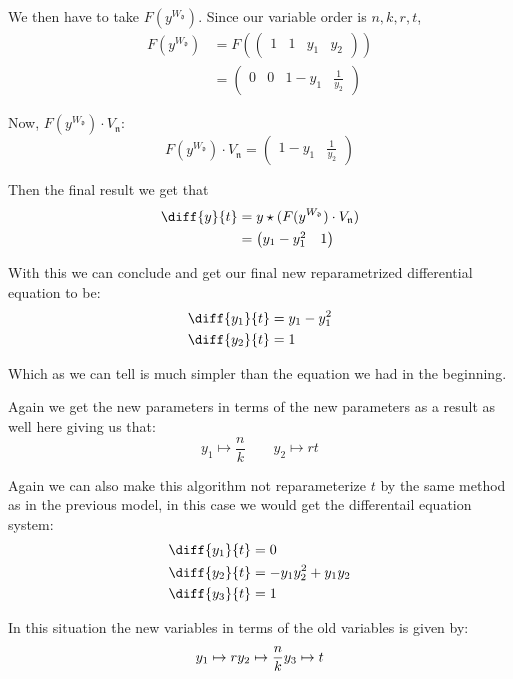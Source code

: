 \documentclass[oneside, a4paper, onecolumn, 11pt]{article}
\begin{document}
We then have to take \(F(y^{W_{\mathfrak{d}}})\). Since our variable order is \(n, k, r, t\),
\begin{align*}
    F(y^{W_{\mathfrak{d}}})
     & = F(\begin{pmatrix}
               1 & 1 & y_1 & y_2
           \end{pmatrix})             \\
     & = \begin{pmatrix}
             0 & 0 & 1 - y_1 & \frac{1}{y_2}
         \end{pmatrix}
\end{align*}

Now, \(F(y^{W_{\mathfrak{d}}}) \cdot V_{\mathfrak{n}}\):
\[
    F(y^{W_{\mathfrak{d}}}) \cdot V_{\mathfrak{n}} =
    \begin{pmatrix}
        1 - y_1 & \frac{1}{y_2}
    \end{pmatrix}
\]

Then the final result we get that
\begin{align*}
    \diff{y}{t}
     & = y \star (F(y^{W_{\mathfrak{d}}}) \cdot V_{\mathfrak{n}}) \\
     & = \begin{pmatrix} y_1 - y_1^2 & 1 \end{pmatrix}
\end{align*}

With this we can conclude and get our final new reparametrized differential equation to be:
\begin{align*}
    \diff{y_1}{t} & = y_1 - y_1^2 \\
    \diff{y_2}{t} & = 1
\end{align*}

Which as we can tell is much simpler than the equation we had in the beginning.

Again we get the new parameters in terms of the new parameters as a result as well here giving us that:
\[
    y_1 \mapsto \frac{n}{k} \qquad
    y_2 \mapsto r t
\]

Again we can also make this algorithm not reparameterize \(t\) by the same method as in the previous model, in this case we would get the differentail equation system:
\begin{align*}
    \diff{y_1}{t} & = 0                    \\
    \diff{y_2}{t} & = -y_1 y_2^2 + y_1 y_2 \\
    \diff{y_3}{t} & = 1
\end{align*}

In this situation the new variables in terms of the old variables is given by:
\[
    y_1 \mapsto r \\
    y_2 \mapsto \frac{n}{k} \\
    y_3 \mapsto t
\]
\end{document}

